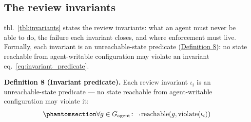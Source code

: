 \documentclass[
  english,
  9pt,
]{extarticle}
\begin{document}
\subsection{The review invariants}\label{the-review-invariants}

tbl.~\ref{tbl:invariants} states the review invariants: what an agent
must never be able to do, the failure each invariant closes, and where
enforcement must live. Formally, each invariant is an unreachable-state
predicate (\hyperref[def:invariant_predicate]{Definition 8}): no state
reachable from agent-writable configuration may violate an invariant
eq.~\ref{eq:invariant_predicate}.

\protect{}\label{def:invariant_predicate}
\textbf{Definition 8 (Invariant predicate).} Each review invariant
\(\iota_i\) is an unreachable-state predicate --- no state reachable
from agent-writable configuration may violate it:
\begin{equation}\protect\phantomsection\label{eq:invariant_predicate}{\forall g \in G_{\mathrm{agent}}\colon \neg\,\mathrm{reachable}(g, \mathrm{violate}(\iota_i))}\end{equation}
\end{document}
